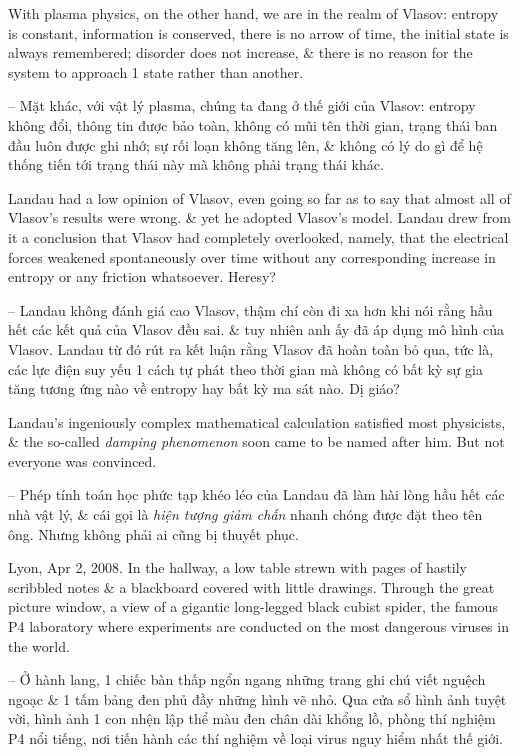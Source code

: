 \documentclass{article}
\begin{document}
\begin{enumerate}
	With plasma physics, on the other hand, we are in the realm of Vlasov: entropy is constant, information is conserved, there is no arrow of time, the initial state is always remembered; disorder does not increase, \& there is no reason for the system to approach 1 state rather than another.

	-- Mặt khác, với vật lý plasma, chúng ta đang ở thế giới của Vlasov: entropy không đổi, thông tin được bảo toàn, không có mũi tên thời gian, trạng thái ban đầu luôn được ghi nhớ; sự rối loạn không tăng lên, \& không có lý do gì để hệ thống tiến tới trạng thái này mà không phải trạng thái khác.

	{\sc Landau} had a low opinion of {\sc Vlasov}, even going so far as to say that almost all of {\sc Vlasov}'s results were wrong. \& yet he adopted {\sc Vlasov}'s model. {\sc Landau} drew from it a conclusion that {\sc Vlasov} had completely overlooked, namely, that the electrical forces weakened spontaneously over time without any corresponding increase in entropy or any friction whatsoever. Heresy?

	-- {\sc Landau} không đánh giá cao {\sc Vlasov}, thậm chí còn đi xa hơn khi nói rằng hầu hết các kết quả của {\sc Vlasov} đều sai. \& tuy nhiên anh ấy đã áp dụng mô hình của {\sc Vlasov}. {\sc Landau} từ đó rút ra kết luận rằng {\sc Vlasov} đã hoàn toàn bỏ qua, tức là, các lực điện suy yếu 1 cách tự phát theo thời gian mà không có bất kỳ sự gia tăng tương ứng nào về entropy hay bất kỳ ma sát nào. Dị giáo?

	{\sc Landau}'s ingeniously complex mathematical calculation satisfied most physicists, \& the so-called {\it damping phenomenon} soon came to be named after him. But not everyone was convinced.

	-- Phép tính toán học phức tạp khéo léo của {\sc Landau} đã làm hài lòng hầu hết các nhà vật lý, \& cái gọi là {\it hiện tượng giảm chấn} nhanh chóng được đặt theo tên ông. Nhưng không phải ai cũng bị thuyết phục.

	 Lyon, Apr 2, 2008. In the hallway, a low table strewn with pages of hastily scribbled notes \& a blackboard covered with little drawings. Through the great picture window, a view of a gigantic long-legged black cubist spider, the famous P4 laboratory where experiments are conducted on the most dangerous viruses in the world.

	-- Ở hành lang, 1 chiếc bàn thấp ngổn ngang những trang ghi chú viết nguệch ngoạc \& 1 tấm bảng đen phủ đầy những hình vẽ nhỏ. Qua cửa sổ hình ảnh tuyệt vời, hình ảnh 1 con nhện lập thể màu đen chân dài khổng lồ, phòng thí nghiệm P4 nổi tiếng, nơi tiến hành các thí nghiệm về loại virus nguy hiểm nhất thế giới.


\end{enumerate}
\end{document}
